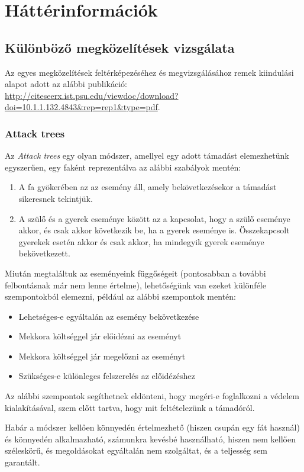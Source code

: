 \chapter{Háttérinformációk}

\section{Különböző megközelítések vizsgálata}

Az egyes megközelítések feltérképezéséhez és megvizsgálásához remek kiindulási alapot adott az
alábbi publikáció: \url{http://citeseerx.ist.psu.edu/viewdoc/download?doi=10.1.1.132.4843&rep=rep1&type=pdf}.

\subsection{Attack trees}

Az \emph{Attack trees} egy olyan módszer, amellyel egy adott támadást elemezhetünk egyszerűen, egy
faként reprezentálva az alábbi szabályok mentén:
\begin{enumerate}
    \item A fa gyökerében az az esemény áll, amely bekövetkezésekor a támadást sikeresnek tekintjük.
    \item A szülő és a gyerek eseménye között az a kapcsolat, hogy a szülő eseménye akkor, és 
        csak akkor következik be, ha a gyerek eseménye is.
        Összekapcsolt gyerekek esetén akkor és csak akkor, ha mindegyik gyerek eseménye bekövetkezett.
\end{enumerate}
Miután megtaláltuk az eseményeink függőségeit (pontosabban a további felbontásnak már nem lenne
értelme), lehetőségünk van ezeket különféle szempontokból elemezni, például az alábbi szempontok mentén:
\begin{itemize}
    \item Lehetséges-e egyáltalán az esemény bekövetkezése
    \item Mekkora költséggel jár előidézni az eseményt
    \item Mekkora költséggel jár megelőzni az eseményt
    \item Szükséges-e különleges felszerelés az előidézéshez
\end{itemize}

Az alábbi szempontok segíthetnek eldönteni, hogy megéri-e foglalkozni a védelem kialakításával,
szem előtt tartva, hogy mit feltételezünk a támadóról.

Habár a módszer kellően könnyedén értelmezhető (hiszen csupán egy fát használ) és könnyedén alkalmazható,
számunkra kevésbé használható, hiszen nem kellően széleskörű, és megoldásokat egyáltalán nem szolgáltat,
és a teljesség sem garantált.

